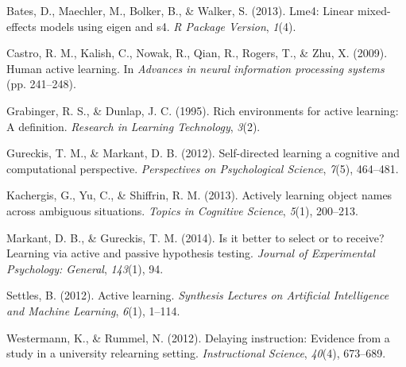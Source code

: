 \documentclass[10pt, letterpaper]{article}
\begin{document}
\setlength{\parindent}{-0.1in} \setlength{\leftskip}{0.125in} \noindent

Bates, D., Maechler, M., Bolker, B., \& Walker, S. (2013). Lme4: Linear
mixed-effects models using eigen and s4. \emph{R Package Version},
\emph{1}(4).

Castro, R. M., Kalish, C., Nowak, R., Qian, R., Rogers, T., \& Zhu, X.
(2009). Human active learning. In \emph{Advances in neural information
processing systems} (pp. 241--248).

Grabinger, R. S., \& Dunlap, J. C. (1995). Rich environments for active
learning: A definition. \emph{Research in Learning Technology},
\emph{3}(2).

Gureckis, T. M., \& Markant, D. B. (2012). Self-directed learning a
cognitive and computational perspective. \emph{Perspectives on
Psychological Science}, \emph{7}(5), 464--481.

Kachergis, G., Yu, C., \& Shiffrin, R. M. (2013). Actively learning
object names across ambiguous situations. \emph{Topics in Cognitive
Science}, \emph{5}(1), 200--213.

Markant, D. B., \& Gureckis, T. M. (2014). Is it better to select or to
receive? Learning via active and passive hypothesis testing.
\emph{Journal of Experimental Psychology: General}, \emph{143}(1), 94.

Settles, B. (2012). Active learning. \emph{Synthesis Lectures on
Artificial Intelligence and Machine Learning}, \emph{6}(1), 1--114.

Westermann, K., \& Rummel, N. (2012). Delaying instruction: Evidence
from a study in a university relearning setting. \emph{Instructional
Science}, \emph{40}(4), 673--689.
\end{document}
